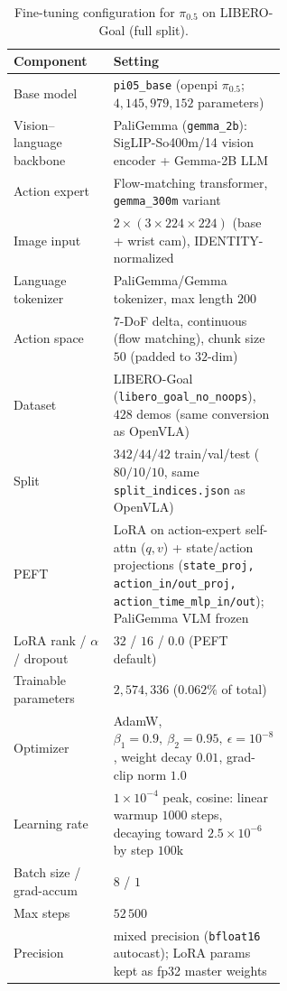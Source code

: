 \documentclass[english,12pt,a4paper,pdftex,elec,utf8]{aaltothesis}
\begin{document}
\begin{table}[t]
  \centering\small
  \caption{Fine-tuning configuration for $\pi_{0.5}$ on LIBERO-Goal (full split).}
  \label{tab:hparams_pi05_full}
  \begin{tabular}{@{}l p{0.60\linewidth}@{}}
    \toprule
    Component & Setting \\
    \midrule
    Base model                & \texttt{pi05\_base} (openpi $\pi_{0.5}$; $4{,}145{,}979{,}152$ parameters) \\
    Vision--language backbone & PaliGemma (\texttt{gemma\_2b}): SigLIP-So400m/14 vision encoder + Gemma-2B LLM \\
    Action expert              & Flow-matching transformer, \texttt{gemma\_300m} variant \\
    Image input                & $2\times(3\times224\times224)$ (base + wrist cam), IDENTITY-normalized \\
    Language tokenizer         & PaliGemma/Gemma tokenizer, max length $200$ \\
    Action space                & $7$-DoF delta, continuous (flow matching), chunk size $50$ (padded to $32$-dim) \\
    Dataset                    & LIBERO-Goal (\texttt{libero\_goal\_no\_noops}), $428$ demos (same conversion as OpenVLA) \\
    Split                      & $342/44/42$ train/val/test ($80/10/10$, same \texttt{split\_indices.json} as OpenVLA) \\
    \midrule
    PEFT                       & LoRA on action-expert self-attn ($q,v$) + state/action projections (\texttt{state\_proj, action\_in/out\_proj, action\_time\_mlp\_in/out}); PaliGemma VLM frozen \\
    LoRA rank / $\alpha$ / dropout & $32$ / $16$ / $0.0$ (PEFT default) \\
    Trainable parameters       & $2{,}574{,}336$ ($0.062\%$ of total) \\
    Optimizer                  & AdamW, $\beta_1{=}0.9,\ \beta_2{=}0.95,\ \epsilon{=}10^{-8}$, weight decay $0.01$, grad-clip norm $1.0$ \\
    Learning rate              & $1\times10^{-4}$ peak, cosine: linear warmup $1000$ steps, decaying toward $2.5\times10^{-6}$ by step $100\text{k}$ \\
    Batch size / grad-accum    & $8$ / $1$ \\
    Max steps                  & $52\,500$ \\
    Precision                   & mixed precision (\texttt{bfloat16} autocast); LoRA params kept as fp32 master weights \\

\end{tabular}
\end{table}
\end{document}
